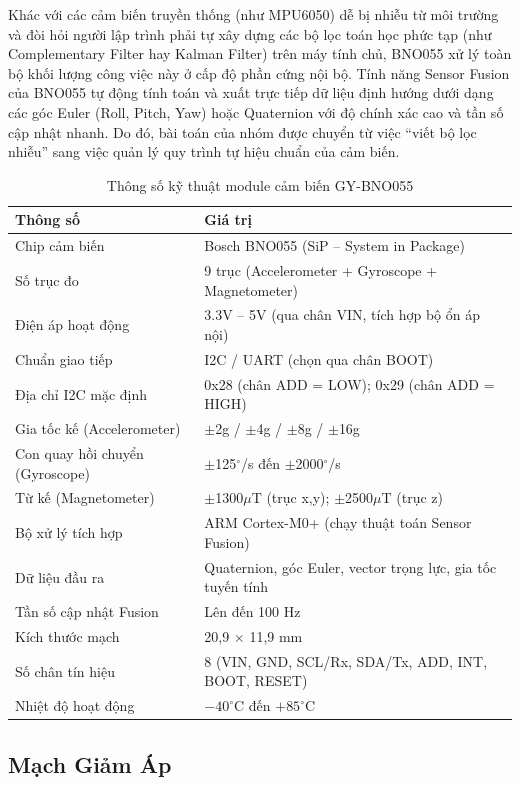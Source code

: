 Khác với các cảm biến truyền thống (như MPU6050) dễ bị nhiễu từ môi trường và đòi hỏi người lập trình phải tự xây dựng các bộ lọc toán học phức tạp (như Complementary Filter hay Kalman Filter) trên máy tính chủ, BNO055 xử lý toàn bộ khối lượng công việc này ở cấp độ phần cứng nội bộ. Tính năng Sensor Fusion của BNO055 tự động tính toán và xuất trực tiếp dữ liệu định hướng dưới dạng các góc Euler (Roll, Pitch, Yaw) hoặc Quaternion với độ chính xác cao và tần số cập nhật nhanh. Do đó, bài toán của nhóm được chuyển từ việc ``viết bộ lọc nhiễu'' sang việc quản lý quy trình tự hiệu chuẩn của cảm biến.
\begin{table}[H]
\centering
\caption{Thông số kỹ thuật module cảm biến GY-BNO055}
\label{tab:bno055_specs}
\renewcommand{\arraystretch}{1.3}
\begin{tabular}{p{} p{}}
\toprule
\textbf{Thông số} & \textbf{Giá trị} \\
\midrule
Chip cảm biến & Bosch BNO055 (SiP -- System in Package) \\
Số trục đo & 9 trục (Accelerometer + Gyroscope + Magnetometer) \\
Điện áp hoạt động & 3.3V -- 5V (qua chân VIN, tích hợp bộ ổn áp nội) \\
Chuẩn giao tiếp & I2C / UART (chọn qua chân BOOT) \\
Địa chỉ I2C mặc định & 0x28 (chân ADD = LOW); 0x29 (chân ADD = HIGH) \\
Gia tốc kế (Accelerometer) & $\pm$2g / $\pm$4g / $\pm$8g / $\pm$16g \\
Con quay hồi chuyển (Gyroscope) & $\pm$125$^\circ$/s đến $\pm$2000$^\circ$/s \\
Từ kế (Magnetometer) & $\pm$1300$\mu$T (trục x,y); $\pm$2500$\mu$T (trục z) \\
Bộ xử lý tích hợp & ARM Cortex-M0+ (chạy thuật toán Sensor Fusion) \\
Dữ liệu đầu ra & Quaternion, góc Euler, vector trọng lực, gia tốc tuyến tính \\
Tần số cập nhật Fusion & Lên đến 100 Hz \\
Kích thước mạch & 20,9 $\times$ 11,9 mm \\
Số chân tín hiệu & 8 (VIN, GND, SCL/Rx, SDA/Tx, ADD, INT, BOOT, RESET) \\
Nhiệt độ hoạt động & $-40^\circ$C đến $+85^\circ$C \\
\bottomrule
\end{tabular}
\end{table}
\subsection{Mạch Giảm Áp}

